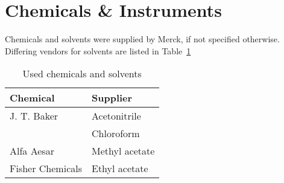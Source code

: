 
\section{Chemicals \& Instruments} %
\label{sec:chemicals_&_instruments}

	Chemicals and solvents were supplied by Merck, if not specified otherwise. Differing vendors for solvents are listed in Table~\ref{tab:solvent_table}

	\begin{table}
		\caption{Used chemicals and solvents}
		\label{tab:solvent_table}
		\centering
		\begin{tabularx}{\textwidth}{XX}
			\toprule
			\textbf{Chemical}	&	\textbf{Supplier}	\\
			\midrule
			J. T. Baker			&	Acetonitrile		\\
								&	Chloroform			\\
			Alfa Aesar			&	Methyl acetate		\\
			Fisher Chemicals 	&	Ethyl acetate		\\
		\end{tabularx}
	\end{table}




